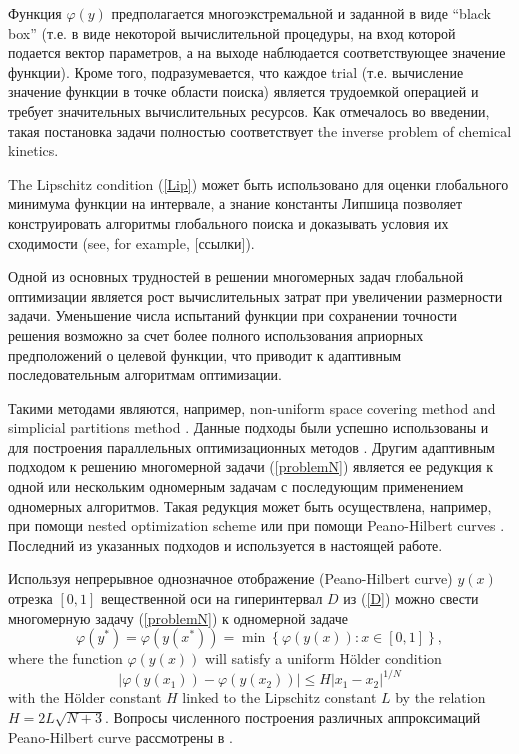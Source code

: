 \documentclass{svproc}
\begin{document}
Функция $\varphi(y)$ предполагается многоэкстремальной и заданной в виде ``black box'' (т.е. в виде некоторой вычислительной процедуры, на вход которой подается вектор параметров, а на выходе наблюдается соответствующее значение функции). Кроме того, подразумевается, что каждое trial (т.е. вычисление значение функции в точке области поиска) является трудоемкой операцией и требует значительных вычислительных ресурсов. Как отмечалось во введении, такая постановка задачи полностью соответствует the inverse problem of chemical kinetics.

The Lipschitz condition (\ref{Lip}) может быть использовано для оценки глобального минимума функции на интервале, а знание константы Липшица позволяет конструировать алгоритмы глобального поиска и доказывать условия их сходимости (see, for example, [ссылки]).

Одной из основных трудностей в решении многомерных задач глобальной оптимизации является рост вычислительных затрат при увеличении размерности задачи. Уменьшение числа испытаний функции при сохранении точности решения возможно за счет более полного использования априорных предположений о целевой функции, что приводит к адаптивным последовательным алгоритмам оптимизации.

Такими методами являются, например, non-uniform space covering method \cite{Evtushenko2013} and simplicial partitions method \cite{Zilinskas2010}. Данные подходы были успешно использованы и для построения параллельных оптимизационных методов \cite{Evtushenko2009,Paulavicius2011}. Другим адаптивным подходом к решению многомерной задачи (\ref{problemN}) является ее редукция к одной или нескольким одномерным задачам с последующим применением одномерных алгоритмов. Такая редукция может быть осуществлена, например, при помощи nested optimization scheme \cite{Grishagin2018} или при помощи Peano-Hilbert curves \cite{Barkalov2018}. Последний из указанных подходов и используется в настоящей работе.

Используя непрерывное однозначное отображение (Peano-Hilbert curve) $y(x)$ отрезка $[0,1]$ вещественной оси на гиперинтервал $D$ из (\ref{D}) можно свести многомерную задачу (\ref{problemN}) к одномерной задаче
\[
\varphi(y^\ast)=\varphi(y(x^\ast))=\min{\left\{\varphi(y(x)): x\in[0,1]\right\}},
\]
where the function $\varphi(y(x))$ will satisfy a uniform H{\"o}lder condition
\[
\left|\varphi(y(x_1))-\varphi(y(x_2))\right|\leq H\left|x_1-x_2\right|^{1/N}
\]
with the H{\"o}lder constant $H$ linked to the Lipschitz constant $L$ by the relation $ H=2 L \sqrt{N+3}$.
Вопросы численного построения различных аппроксимаций Peano-Hilbert curve рассмотрены в \cite{Strongin2000,Sergeyev2013}.
\end{document}
